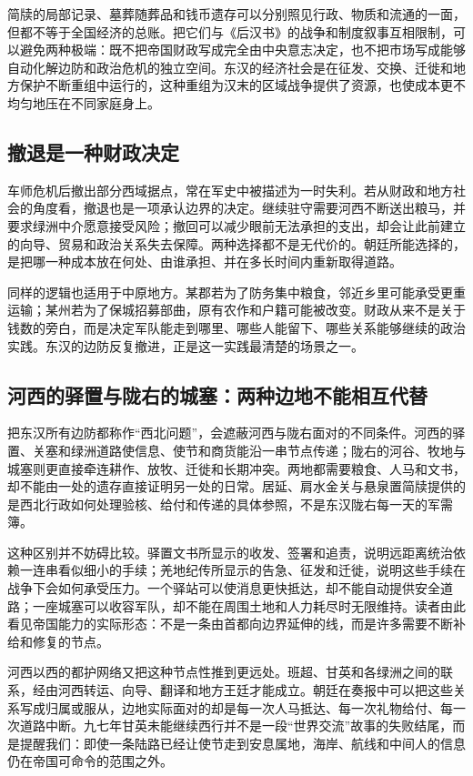简牍的局部记录、墓葬随葬品和钱币遗存可以分别照见行政、物质和流通的一面，但都不等于全国经济的总账。把它们与《后汉书》的战争和制度叙事互相限制，可以避免两种极端：既不把帝国财政写成完全由中央意志决定，也不把市场写成能够自动化解边防和政治危机的独立空间。东汉的经济社会是在征发、交换、迁徙和地方保护不断重组中运行的，这种重组为汉末的区域战争提供了资源，也使成本更不均匀地压在不同家庭身上。

\subsection{撤退是一种财政决定}

车师危机后撤出部分西域据点，常在军史中被描述为一时失利。若从财政和地方社会的角度看，撤退也是一项承认边界的决定。继续驻守需要河西不断送出粮马，并要求绿洲中介愿意接受风险；撤回可以减少眼前无法承担的支出，却会让此前建立的向导、贸易和政治关系失去保障。两种选择都不是无代价的。朝廷所能选择的，是把哪一种成本放在何处、由谁承担、并在多长时间内重新取得道路。

同样的逻辑也适用于中原地方。某郡若为了防务集中粮食，邻近乡里可能承受更重运输；某州若为了保城招募部曲，原有农作和户籍可能被改变。财政从来不是关于钱数的旁白，而是决定军队能走到哪里、哪些人能留下、哪些关系能够继续的政治实践。东汉的边防反复撤进，正是这一实践最清楚的场景之一。

\subsection{河西的驿置与陇右的城塞：两种边地不能相互代替}

把东汉所有边防都称作“西北问题”，会遮蔽河西与陇右面对的不同条件。河西的驿置、关塞和绿洲道路使信息、使节和商货能沿一串节点传递；陇右的河谷、牧地与城塞则更直接牵连耕作、放牧、迁徙和长期冲突。两地都需要粮食、人马和文书，却不能由一处的遗存直接证明另一处的日常。居延、肩水金关与悬泉置简牍提供的是西北行政如何处理验核、给付和传递的具体参照，不是东汉陇右每一天的军需簿。

这种区别并不妨碍比较。驿置文书所显示的收发、签署和追责，说明远距离统治依赖一连串看似细小的手续；羌地纪传所显示的告急、征发和迁徙，说明这些手续在战争下会如何承受压力。一个驿站可以使消息更快抵达，却不能自动提供安全道路；一座城塞可以收容军队，却不能在周围土地和人力耗尽时无限维持。读者由此看见帝国能力的实际形态：不是一条由首都向边界延伸的线，而是许多需要不断补给和修复的节点。

河西以西的都护网络又把这种节点性推到更远处。班超、甘英和各绿洲之间的联系，经由河西转运、向导、翻译和地方王廷才能成立。朝廷在奏报中可以把这些关系写成归属或服从，边地实际面对的却是每一次人马抵达、每一次礼物给付、每一次道路中断。九七年甘英未能继续西行并不是一段“世界交流”故事的失败结尾，而是提醒我们：即使一条陆路已经让使节走到安息属地，海岸、航线和中间人的信息仍在帝国可命令的范围之外。

